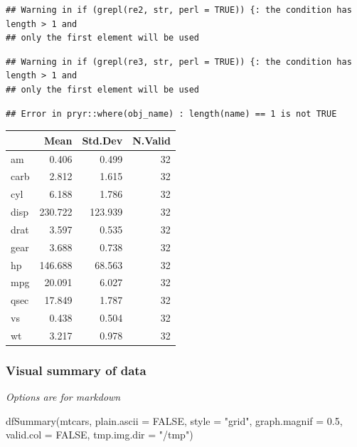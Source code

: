 \documentclass[
]{article}
\newenvironment{Shaded}{\begin{snugshade}}{\end{snugshade}}
\newcommand{\AttributeTok}[1]{\textcolor[rgb]{0.77,0.63,0.00}{#1}}
\newcommand{\ConstantTok}[1]{\textcolor[rgb]{0.00,0.00,0.00}{#1}}
\newcommand{\FloatTok}[1]{\textcolor[rgb]{0.00,0.00,0.81}{#1}}
\newcommand{\FunctionTok}[1]{\textcolor[rgb]{0.00,0.00,0.00}{#1}}
\newcommand{\NormalTok}[1]{#1}
\newcommand{\StringTok}[1]{\textcolor[rgb]{0.31,0.60,0.02}{#1}}
\begin{document}
\begin{verbatim}
## Warning in if (grepl(re2, str, perl = TRUE)) {: the condition has length > 1 and
## only the first element will be used
\end{verbatim}

\begin{verbatim}
## Warning in if (grepl(re3, str, perl = TRUE)) {: the condition has length > 1 and
## only the first element will be used
\end{verbatim}

\begin{verbatim}
## Error in pryr::where(obj_name) : length(name) == 1 is not TRUE
\end{verbatim}

\begin{table}
\centering
\begin{tabular}{l|r|r|r}
\hline
  & Mean & Std.Dev & N.Valid\\
\hline
am & 0.406 & 0.499 & 32\\
\hline
carb & 2.812 & 1.615 & 32\\
\hline
cyl & 6.188 & 1.786 & 32\\
\hline
disp & 230.722 & 123.939 & 32\\
\hline
drat & 3.597 & 0.535 & 32\\
\hline
gear & 3.688 & 0.738 & 32\\
\hline
hp & 146.688 & 68.563 & 32\\
\hline
mpg & 20.091 & 6.027 & 32\\
\hline
qsec & 17.849 & 1.787 & 32\\
\hline
vs & 0.438 & 0.504 & 32\\
\hline
wt & 3.217 & 0.978 & 32\\
\hline
\end{tabular}
\end{table}

\hypertarget{visual-summary-of-data}{%
\subsubsection{Visual summary of data}\label{visual-summary-of-data}}

\emph{Options are for markdown}

\begin{Shaded}
\begin{Highlighting}[]
\FunctionTok{dfSummary}\NormalTok{(mtcars, }\AttributeTok{plain.ascii =} \ConstantTok{FALSE}\NormalTok{, }\AttributeTok{style =} \StringTok{"grid"}\NormalTok{, }
          \AttributeTok{graph.magnif =} \FloatTok{0.5}\NormalTok{, }\AttributeTok{valid.col =} \ConstantTok{FALSE}\NormalTok{, }\AttributeTok{tmp.img.dir =} \StringTok{"/tmp"}\NormalTok{)}
\end{Highlighting}
\end{Shaded}
\end{document}
